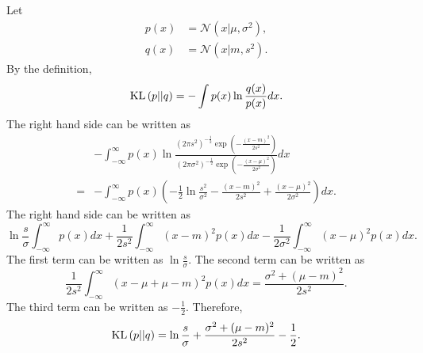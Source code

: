 \subsection{}
\label{1.30}
Let 
%
\begin{equation}
\begin{aligned}
p(x) 
&= 
\mathcal{N} 
\left( 
	x 
	| 
	\mu, 
	\sigma ^2 
\right), \\
q(x) 
&= 
\mathcal{N} 
\left( 
	x 
	| 
	m, 
	s ^2 
\right).
\end{aligned}
\end{equation}
%
By the definition,
%
\begin{equation}
{\rm KL} 
\left( 
	p 
	|| 
	q 
\right) 
= 
- 
\int 
p(x) 
\ln 
\frac{q(x)}{p(x)} 
dx.
\end{equation}
%
The right hand side can be written as 
%
\begin{equation}
\begin{aligned}
&
- 
\int_{- \infty}^{\infty} 
p(x) 
\ln 
\frac{
\left( 
	2 \pi s ^ 2 
\right) ^ {- \frac{1}{2}} 
\exp 
\left( 
	- 
	\frac{(x - m) ^ 2}{2 s ^ 2} 
\right)
}
{
\left( 
	2 \pi \sigma ^ 2 
\right) ^ {- \frac{1}{2}} 
\exp 
\left( 
	- 
	\frac{(x - \mu) ^ 2}{2 \sigma ^ 2} 
\right)} 
dx 
\\ 
= 
&
- 
\int_{- \infty}^{\infty} 
p(x) 
\left( 
	-
	\frac{1}{2} 
	\ln \frac{s ^ 2}{\sigma ^ 2} 
	- 
	\frac{(x - m) ^ 2}{2 s ^ 2} 
	+ 
	\frac{(x - \mu) ^ 2}{2 \sigma ^ 2} 
\right) 
dx.
\end{aligned}
\end{equation}
%
The right hand side can be written as
%
\begin{equation}
\ln \frac{s}{\sigma} 
\int_{- \infty}^{\infty} 
p(x) 
dx 
+ 
\frac{1}{2 s ^2} 
\int_{- \infty}^{\infty} 
(x - m) ^ 2 
p(x) 
dx 
- 
\frac{1}{2 \sigma ^2} 
\int_{- \infty}^{\infty} 
(x - \mu) ^ 2 
p(x) 
dx.
\end{equation}
%
%
The first term can be written as $\ln \frac{s}{\sigma}$.
%
The second term can be written as
%
\begin{equation}
\frac{1}{2 s ^2} 
\int_{- \infty}^{\infty} 
(x - \mu + \mu - m) ^ 2 
p(x) 
dx 
= 
\frac{\sigma ^ 2 + (\mu - m) ^ 2}{2 s ^ 2}.
\end{equation}
%
The third term can be written as $- \frac{1}{2}$.
Therefore,
%
\begin{equation}
{\rm KL} 
\left( 
	p 
	|| 
	q 
\right) 
= 
\ln \frac{s}{\sigma} 
+ 
\frac{\sigma ^ 2 + (\mu - m) ^ 2}{2 s ^ 2} 
- 
\frac{1}{2}. 
\end{equation}
%


